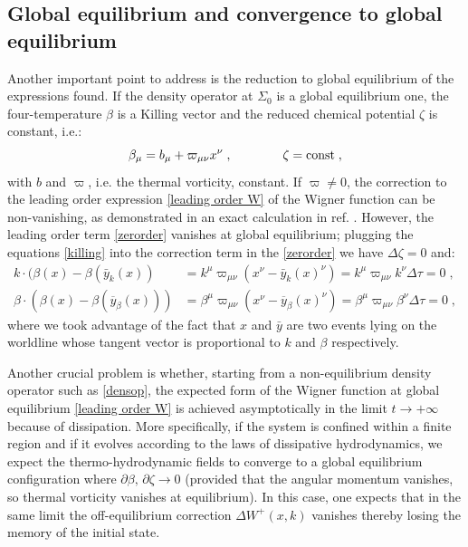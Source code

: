 \documentclass[prd,superscriptaddress,nofootinbib,notitlepage]{revtex4-1}
\newcommand{\be}{\begin{equation}}
\newcommand{\ee}{\end{equation}}
\begin{document}
\subsection{Global equilibrium and convergence to global equilibrium}

Another important point to address is the reduction to global equilibrium of the expressions found. If the density operator at $\Sigma_0$ 
is a global equilibrium one, the four-temperature $\beta$ is a Killing vector and the reduced chemical potential $\zeta$ is constant, i.e.:
%
\be\label{killing}
   \beta_\mu = b_\mu + \varpi_{\mu\nu} x^\nu\;, \qquad\qquad \zeta = {\rm const}\;,
\ee
%
with $b$ and $\varpi$, i.e. the thermal vorticity, constant. If $\varpi \ne 0$, the correction to the leading order expression 
\eqref{leading order W} of the Wigner function can be non-vanishing, as demonstrated in an exact calculation in ref. \cite{Becattini:2020qol}.
However, the leading order term \eqref{zerorder} vanishes at global equilibrium; plugging the equations \eqref{killing} into the 
correction term in the \eqref{zerorder} we have $\Delta \zeta = 0$ and:
%
\begin{equation*}
    \begin{split}
         k \cdot (\beta(x) - \beta(\bar y_k(x)) &= k^\mu \varpi_{\mu\nu} (x^\nu - \bar y_k(x)^\nu)=
   k^\mu \varpi_{\mu\nu} k^\nu \Delta \tau = 0\;,\\
   \beta\cdot\left(\beta(x)-\beta(\overline{y}_\beta(x))\right)&=\beta^\mu\varpi_{\mu\nu}\left(x^\nu-\overline{y}_\beta(x)^\nu\right)=\beta^\mu\varpi_{\mu\nu}\beta^\nu\Delta\tau=0\;,
    \end{split}
\end{equation*}
%
where we took advantage of the fact that $x$ and $\bar y$ are two events lying on the worldline whose tangent
vector is proportional to $k$ and $\beta$ respectively. 

Another crucial problem is whether, starting from a non-equilibrium density operator such as \eqref{densop}, the expected
form of the Wigner function at global equilibrium \eqref{leading order W} is achieved asymptotically in the limit 
$t \to +\infty$ because of dissipation. More specifically, if the system is confined within a finite region and if it 
evolves according to the laws of dissipative hydrodynamics, we expect the thermo-hydrodynamic fields to converge to a global 
equilibrium configuration where $\partial \beta,\, \partial \zeta \to 0$ (provided that the angular momentum vanishes, so thermal 
vorticity vanishes at equilibrium). In this case, one expects that in the same limit the off-equilibrium correction 
$\Delta W^+(x,k)$ vanishes thereby losing the memory of the initial state. 
\end{document}
